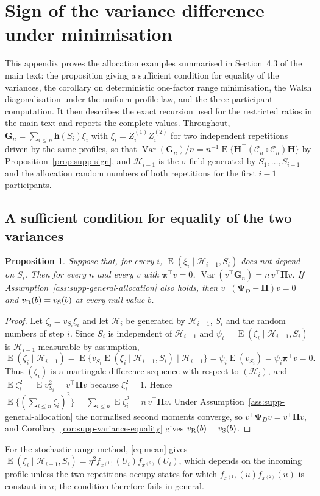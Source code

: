\documentclass[12pt,a4paper]{article}
\newtheorem{proposition}{Proposition}
\theoremstyle{definition}
\theoremstyle{remark}\newtheorem{remark}{Remark}
\numberwithin{equation}{section}
\newcommand{\E}{\operatorname{E}}
\newcommand{\Var}{\operatorname{Var}}
\begin{document}
\section{Sign of the variance difference under minimisation}\label{sec:supp-sign-min}
This appendix proves the allocation examples summarised in Section~4.3 of the main text: the proposition giving a sufficient condition for equality of the variances, the corollary on deterministic one-factor range minimisation, the Walsh diagonalisation under the uniform profile law, and the three-participant computation. It then describes the exact recursion used for the restricted ratios in the main text and reports the complete values. Throughout, $\bm G_n=\sum_{i\le n}\bm h(S_i)\xi_i$ with $\xi_i=Z_i^{(1)}Z_i^{(2)}$ for two independent repetitions driven by the same profiles, so that $\Var(\bm G_n)/n=n^{-1}\E\{\bm H^\top(\mathcal C_n\circ\mathcal C_n)\bm H\}$ by Proposition~\ref{prop:supp-sign}, and $\mathcal H_{i-1}$ is the $\sigma$-field generated by $S_1,\ldots,S_{i-1}$ and the allocation random numbers of both repetitions for the first $i-1$ participants.

\subsection{A sufficient condition for equality of the two variances}
\begin{proposition}\label{prop:supp-blind}
Suppose that, for every $i$, $\E(\xi_i\mid\mathcal H_{i-1},S_i)$ does not depend on $S_i$. Then for every $n$ and every $v$ with $\bm\pi^\top v=0$, $\Var(v^\top\bm G_n)=n\,v^\top\bm\Pi v$. If Assumption~\ref{ass:supp-general-allocation} also holds, then $v^\top(\bm\Psi_D-\bm\Pi)v=0$ and $v_{\rm R}(b)=v_{\rm S}(b)$ at every null value $b$.
\end{proposition}
\begin{proof}
Let $\zeta_i=v_{S_i}\xi_i$ and let $\mathcal H_i$ be generated by $\mathcal H_{i-1}$, $S_i$ and the random numbers of step $i$. Since $S_i$ is independent of $\mathcal H_{i-1}$ and $\psi_i=\E(\xi_i\mid\mathcal H_{i-1},S_i)$ is $\mathcal H_{i-1}$-measurable by assumption,
\[
 \E(\zeta_i\mid\mathcal H_{i-1})=\E\{v_{S_i}\E(\xi_i\mid\mathcal H_{i-1},S_i)\mid\mathcal H_{i-1}\}
 =\psi_i\E(v_{S_i})=\psi_i\bm\pi^\top v=0.
\]
Thus $(\zeta_i)$ is a martingale difference sequence with respect to $(\mathcal H_i)$, and $\E\zeta_i^2=\E v_{S_i}^2=v^\top\bm\Pi v$ because $\xi_i^2=1$. Hence $\E\{(\sum_{i\le n}\zeta_i)^2\}=\sum_{i\le n}\E\zeta_i^2=n\,v^\top\bm\Pi v$. Under Assumption~\ref{ass:supp-general-allocation} the normalised second moments converge, so $v^\top\bm\Psi_Dv=v^\top\bm\Pi v$, and Corollary~\ref{cor:supp-variance-equality} gives $v_{\rm R}(b)=v_{\rm S}(b)$.
\end{proof}
For the stochastic range method, \eqref{eq:mean} gives $\E(\xi_i\mid\mathcal H_{i-1},S_i)=\eta^2f_{x^{(1)}}(U_i)f_{x^{(2)}}(U_i)$, which depends on the incoming profile unless the two repetitions occupy states for which $f_{x^{(1)}}(u)f_{x^{(2)}}(u)$ is constant in $u$; the condition therefore fails in general.
\end{document}
